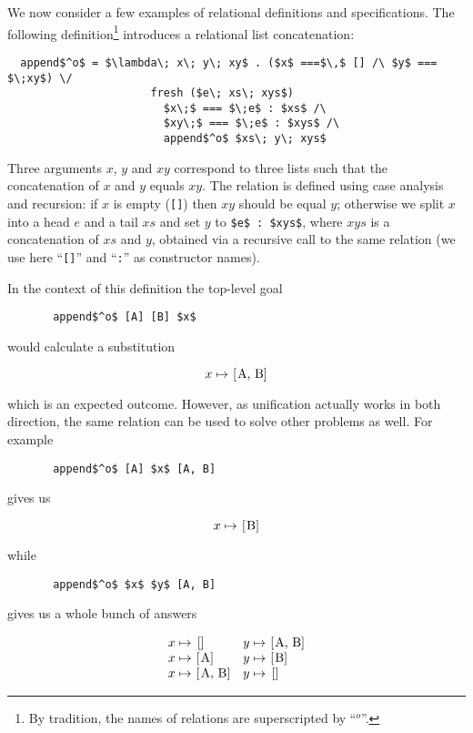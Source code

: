 We now consider a few examples of relational definitions and specifications. The following definition\footnote{By tradition, the names of relations are superscripted by ``$^o$''.}
introduces a relational list concatenation:

\begin{lstlisting}
  append$^o$ = $\lambda\; x\; y\; xy$ . ($x$ ===$\,$ [] /\ $y$ === $\;xy$) \/
                      fresh ($e\; xs\; xys$) 
                        $x\;$ === $\;e$ : $xs$ /\ 
                        $xy\;$ === $\;e$ : $xys$ /\ 
                        append$^o$ $xs\; y\; xys$
\end{lstlisting}

Three arguments $x$, $y$ and $xy$ correspond to three lists such that the concatenation of $x$ and $y$ equals $xy$. The relation is defined using case analysis and recursion: if
$x$ is empty (\lstinline|[]|) then $xy$ should be equal $y$; otherwise we split $x$ into a head $e$ and a tail $xs$ and set $y$ to \lstinline|$e$ : $xys$|, where
$xys$ is a concatenation of $xs$ and $y$, obtained via a recursive call to the same relation (we use here ``\lstinline|[]|'' and ``\lstinline|:|'' as constructor names).

In the context of this definition the top-level goal

\begin{lstlisting}
       append$^o$ [A] [B] $x$
\end{lstlisting}

would calculate a substitution

\[
x \mapsto \mbox{\lstinline|[A, B]|}
\]

which is an expected outcome. However, as unification actually works in both direction, the same relation can be used to solve other problems as well. For example

\begin{lstlisting}
       append$^o$ [A] $x$ [A, B]
\end{lstlisting}

gives us

\[
x \mapsto \mbox{\lstinline|[B]|}
\]

while

\begin{lstlisting}
       append$^o$ $x$ $y$ [A, B]
\end{lstlisting}

gives us a whole bunch of answers

\[
\begin{array}{ll}
  x \mapsto \mbox{\lstinline|[]|} & y \mapsto \mbox{\lstinline|[A, B]|} \\
  x \mapsto \mbox{\lstinline|[A]|} & y \mapsto \mbox{\lstinline|[B]|} \\
  x \mapsto \mbox{\lstinline|[A, B]|} & y \mapsto \mbox{\lstinline|[]|} 
\end{array}
\]

